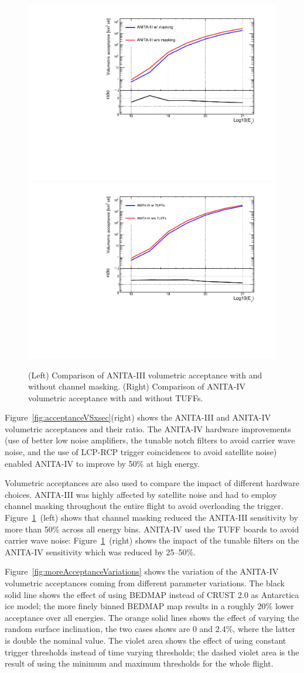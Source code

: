 \begin{figure}[!h]\centering
  \includegraphics[width=.45\linewidth]{./Figs/CompareEffVol_A3masking.pdf}
  \includegraphics[width=.45\linewidth]{./Figs/CompareEffVol_A4tuff.pdf}
  \caption{(Left) Comparison of ANITA-III volumetric acceptance with and without channel masking.
  (Right) Comparison of ANITA-IV volumetric acceptance with and without TUFFs.}
  \label{fig:acceptanceVariations}
\end{figure}

Figure~\ref{fig:acceptanceVSxsec}(right) shows the ANITA-III and ANITA-IV volumetric acceptances and their ratio.
The ANITA-IV hardware improvements (use of better low noise amplifiers, the tunable notch filters to avoid carrier wave noise, and the use of LCP-RCP trigger coincidences to avoid satellite noise) enabled ANITA-IV to improve by 50\% at high energy.

Volumetric acceptances are also used to compare the impact of different hardware choices.
ANITA-III was highly affected by satellite noise and had to employ channel masking throughout the entire flight to avoid overloading the trigger. Figure~\ref{fig:acceptanceVariations}~(left) shows that channel masking reduced the ANITA-III sensitivity by more than 50\% across all energy bins.
ANITA-IV used the TUFF boards to avoid carrier wave noise: Figure~\ref{fig:acceptanceVariations}~(right) shows the impact of the tunable filters on the ANITA-IV sensitivity which was reduced by 25--50\%.

Figure~\ref{fig:moreAcceptanceVariations} shows the variation of the ANITA-IV volumetric acceptances coming from different \icemc parameter variations.
The black solid line shows the effect of using BEDMAP instead of CRUST 2.0 as Antarctica ice model; the more finely binned BEDMAP map results in a roughly 20\% lower acceptance over all energies.
The orange solid lines shows the effect of varying the random surface inclination, the two cases shows are 0 and 2.4\%, where the latter is double the nominal value.
The violet area shows the effect of using constant trigger thresholds instead of time varying thresholds; the dashed violet area is the result of using the minimum and maximum thresholds for the whole flight.


